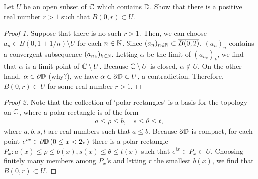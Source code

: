 \begin{prob}
    Let $U$ be an open subset of ${\mathbb{C}}$ which contains ${\mathbb{D}}$.
    Show that there is a positive real number $r>1$ such that $B(0, r)\subset U$.
\end{prob}
\begin{proof}[Proof 1]
    Suppose that there is no such $r>1$.
    Then, we can choose $a_n\in B(0, 1+1/n)\setminus U$ for each $n\in{\mathbb{N}}$.
    Since $(a_n)_{n\in{\mathbb{N}}}\subset\overline{B(0, 2)}$, $(a_n)_n$ contains a convergent subsequence $(a_{n_k})_{k\in{\mathbb{N}}}$.
    Letting $\alpha$ be the limit of $(a_{n_k})_k$, we find that $\alpha$ is a limit point of ${\mathbb{C}}\setminus U$.
    Because ${\mathbb{C}}\setminus U$ is closed, $\alpha\notin U$.
    On the other hand, $\alpha\in\partial{\mathbb{D}}$ \color{brown}(why?)\color{black}, we have $\alpha\in\partial{\mathbb{D}}\subset U$, a contradiction.
    Therefore, $B(0, r)\subset U$ for some real number $r>1$.
\end{proof}
\begin{proof}[Proof 2]
    Note that the collection of `polar rectangles' is a basis for the topology on ${\mathbb{C}}$, where a polar rectangle is of the form
    \begin{align*}
        a\leq \rho\leq b,\quad s\leq \theta\leq t,
    \end{align*}
    where $a, b, s, t$ are real numbers such that $a\leq b$.
    Because $\partial{\mathbb{D}}$ is compact, for each point $e^{ix}\in\partial{\mathbb{D}}\,(0\leq x<2\pi)$ there is a polar rectangle $P_x: a(x)\leq \rho\leq b(x), s(x)\leq \theta\leq t(x)$ such that $e^{ix}\in P_x\subset U$.
    Choosing finitely many members among $P_x$'s and letting $r$ the smallest $b(x)$, we find that $B(0, r)\subset U$.
\end{proof}